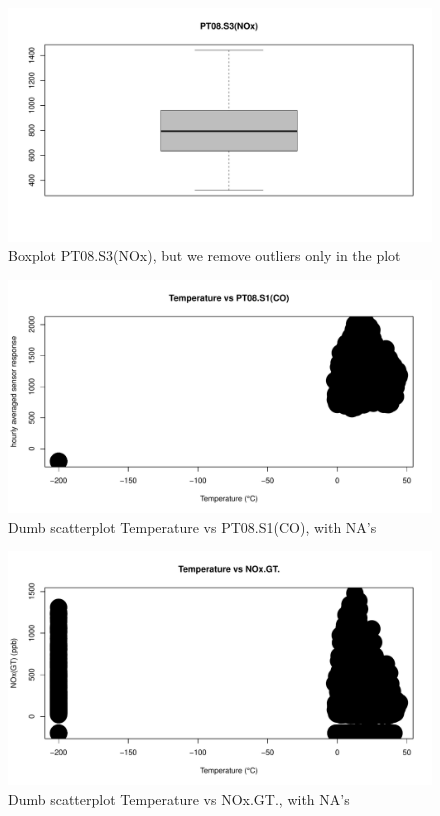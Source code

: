 \documentclass{article}
\begin{document}
\begin{figure}[H]
   \centering
   \includegraphics[width=\linewidth]{images/PT08.S3Boxplot.pdf}
   \caption{Boxplot PT08.S3(NOx), but we remove outliers only in the plot}
   \label{fig:fig8}
\end{figure}
\begin{figure}[H]
   \centering
   \includegraphics[width=\linewidth]{images/TempvsPT08.pdf}
   \caption{Dumb scatterplot Temperature vs PT08.S1(CO), with NA's}
   \label{fig:fig6}
\end{figure}
\begin{figure}[H]
   \centering
   \includegraphics[width=\linewidth]{images/TempvsNOcGT.pdf}
   \caption{Dumb scatterplot Temperature vs NOx.GT., with NA's}
   \label{fig:fig7}
\end{figure}
\end{document}
